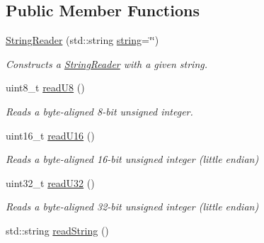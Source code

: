 \subsection*{Public Member Functions}
\begin{DoxyCompactItemize}
\item 
\hyperlink{classjswf_1_1io_1_1_string_reader_a929e5ce4945d5685c15e45f8a3072248}{String\+Reader} (std\+::string \hyperlink{namespacejswf_a755127d61081aa8af105eb800aa2c1ec}{string}=\char`\"{}\char`\"{})
\begin{DoxyCompactList}\small\item\em Constructs a \hyperlink{classjswf_1_1io_1_1_string_reader}{String\+Reader} with a given string. \end{DoxyCompactList}\item 
\hypertarget{classjswf_1_1io_1_1_string_reader_a3c204c47950debc47676d29b9a6dea06}{uint8\+\_\+t \hyperlink{classjswf_1_1io_1_1_string_reader_a3c204c47950debc47676d29b9a6dea06}{read\+U8} ()}\label{classjswf_1_1io_1_1_string_reader_a3c204c47950debc47676d29b9a6dea06}

\begin{DoxyCompactList}\small\item\em Reads a byte-\/aligned 8-\/bit unsigned integer. \end{DoxyCompactList}\item 
\hypertarget{classjswf_1_1io_1_1_string_reader_a460f5655e6729ad34548791f7fc4a8f5}{uint16\+\_\+t \hyperlink{classjswf_1_1io_1_1_string_reader_a460f5655e6729ad34548791f7fc4a8f5}{read\+U16} ()}\label{classjswf_1_1io_1_1_string_reader_a460f5655e6729ad34548791f7fc4a8f5}

\begin{DoxyCompactList}\small\item\em Reads a byte-\/aligned 16-\/bit unsigned integer (little endian) \end{DoxyCompactList}\item 
\hypertarget{classjswf_1_1io_1_1_string_reader_a44867abdd6da4a8ba548380d973bd24a}{uint32\+\_\+t \hyperlink{classjswf_1_1io_1_1_string_reader_a44867abdd6da4a8ba548380d973bd24a}{read\+U32} ()}\label{classjswf_1_1io_1_1_string_reader_a44867abdd6da4a8ba548380d973bd24a}

\begin{DoxyCompactList}\small\item\em Reads a byte-\/aligned 32-\/bit unsigned integer (little endian) \end{DoxyCompactList}\item 
\hypertarget{classjswf_1_1io_1_1_string_reader_aa5e7d00a821f006f1c3c243dc094da3c}{std\+::string \hyperlink{classjswf_1_1io_1_1_string_reader_aa5e7d00a821f006f1c3c243dc094da3c}{read\+String} ()}\label{classjswf_1_1io_1_1_string_reader_aa5e7d00a821f006f1c3c243dc094da3c}


\end{DoxyCompactItemize}
